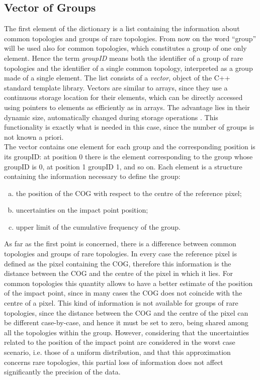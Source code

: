 \subsection{Vector of Groups}
The first element of the dictionary is a list containing the information about common topologies and groups of rare topologies. From now on the word ``group'' will be used also for common topologies, which constitutes a group of one only element. Hence the term \textit{groupID} means both the identifier of a group of rare topologies and the identifier of a single common topology, interpreted as a group made of a single element. The list consists of a \textit{vector}, object of the C++ standard template library. Vectors are similar to arrays, since they use a continuous storage location for their elements, which can be directly accessed using pointers to elements as efficiently as in arrays. The advantage lies in their dynamic size, automatically changed during storage operations \cite{vector}. This functionality is exactly what is needed in this case, since the number of groups is not known a priori.\\
The vector contains one element for each group and the corresponding position is its groupID: at position 0 there is the element corresponding to the group whose groupID is 0, at position 1 groupID 1, and so on. Each element is a structure containing the information necessary to define the group:
\begin{enumerate}[a)]
 \item the position of the COG with respect to the centre of the reference pixel;
 \item uncertainties on the impact point position;
 \item upper limit of the cumulative frequency of the group.
\end{enumerate}
As far as the first point is concerned, there is a difference between common topologies and groups of rare topologies. In every case the reference pixel is defined as the pixel containing the COG, therefore this information is the distance between the COG and the centre of the pixel in which it lies. For common topologies this quantity allows to have a better estimate of the position of the impact point, since in many cases the COG does not coincide with the centre of a pixel. This kind of information is not available for groups of rare topologies, since the distance between the COG and the centre of the pixel can be different case-by-case, and hence it must be set to zero, being shared among all the topologies within the group. However, considering that the uncertainties related to the position of the impact point are considered in the worst case scenario, i.e. those of a uniform distribution, and that this approximation concerns rare topologies, this partial loss of information does not affect significantly the precision of the data.\\
